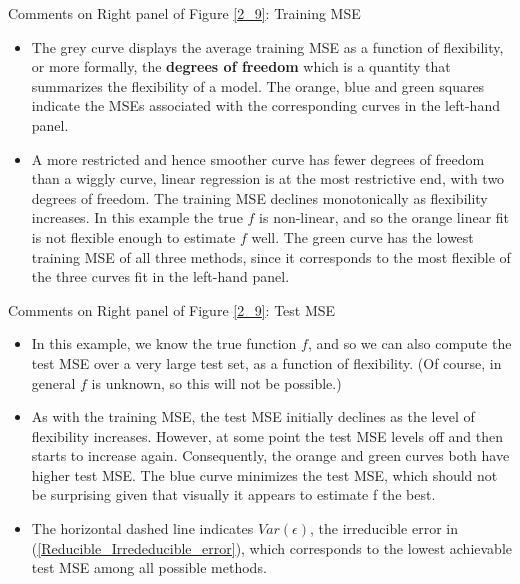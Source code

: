\documentclass[10pt,a4paper]{beamer}
\begin{document}
\begin{frame}{Comments on Right panel of Figure \ref{2_9}: Training MSE}

\begin{itemize}\small
  \item The grey curve displays the average training MSE as a function of flexibility, or more formally, the \textbf{degrees of freedom} which is a quantity that summarizes the flexibility of a model. The orange, blue and green squares
indicate the MSEs associated with the corresponding curves in the left-hand panel.
  \item A more restricted and hence smoother curve has fewer degrees
of freedom than a wiggly curve, linear regression
is at the most restrictive end, with two degrees of freedom. The training
MSE declines monotonically as flexibility increases. In this example the
true $f$ is non-linear, and so the orange linear fit is not flexible enough to
estimate $f$ well. The green curve has the lowest training MSE of all three
methods, since it corresponds to the most flexible of the three curves fit in
the left-hand panel.
\end{itemize}

\end{frame}

\begin{frame}{Comments on Right panel of Figure \ref{2_9}: Test MSE}

\begin{itemize}
  \item In this example, we know the true function $f$, and so we can also compute the test MSE over a very large test set, as a function of flexibility. (Of
course, in general $f$ is unknown, so this will not be possible.)
  \item As with the training MSE, the test MSE initially declines as the level of flexibility increases. However, at some point the test MSE levels off and then
starts to increase again. Consequently, the orange and green curves both have higher test MSE. The blue curve minimizes the test MSE, which should
not be surprising given that visually it appears to estimate f the best.
  \item The horizontal dashed line indicates $Var(\epsilon)$, the irreducible error in (\ref{Reducible_Irrededucible_error}), which corresponds to the lowest achievable
test MSE among all possible methods.
\end{itemize}


\end{frame}
\end{document}
